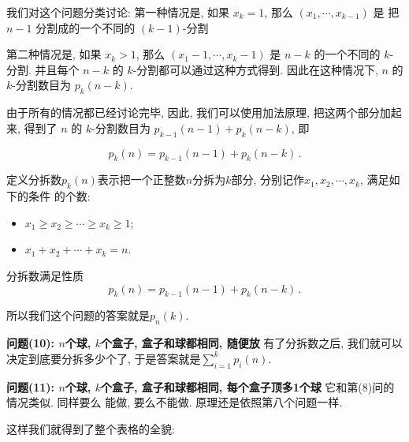 我们对这个问题分类讨论: 第一种情况是, 如果 \(x_k = 1\),
那么 \((x_1,\cdots,x_{k-1})\) 是 把\(n-1\) 分割成的一个不同的 \((k-1)\)-分割

第二种情况是, 如果 \(x_k > 1\), 那么 \((x_1-1,\cdots,x_{k}-1)\) 是 \(n-k\)
的一个不同的 \(k\)-分割. 并且每个 \(n-k\) 的 \(k\)-分割都可以通过这种方式得到.
因此在这种情况下, \(n\) 的 \(k\)-分割数目为 \(p_k(n-k)\).

由于所有的情况都已经讨论完毕, 因此, 我们可以使用加法原理, 把这两个部分加起来, 得到了
\(n\) 的 \(k\)-分割数目为 \(p_{k-1}(n-1) + p_k(n-k)\), 即

\[p_k(n)=p_{k-1}(n-1)+p_k(n-k)\,.\]

\begin{definition}[分拆数]
    定义分拆数$p_k(n)$表示把一个正整数$n$分拆为$k$部分, 分别记作$x_1, x_2, \cdots, x_k$, 满足如下的条件
    的个数:
    \begin{itemize}[noitemsep]
        \item  $x_1\ge x_2\ge\cdots\ge x_k\ge 1$;
        \item $x_1+x_2+\cdots+x_k=n$.
    \end{itemize}
\end{definition}

\begin{theorem}
    分拆数满足性质
    $$p_k(n)=p_{k-1}(n-1)+p_k(n-k)\,.$$
\end{theorem}

所以我们这个问题的答案就是$p_n(k)$.

\textbf{问题(10): $n$个球, $k$个盒子, 盒子和球都相同, 随便放}
有了分拆数之后, 我们就可以决定到底要分拆多少个了,  于是答案就是$\sum_{i=1}^{k}p_i(n)$.

\textbf{问题(11): $n$个球, $k$个盒子, 盒子和球都相同, 每个盒子顶多1个球} 它和第(8)问的情况类似. 同样要么
能做, 要么不能做. 原理还是依照第八个问题一样.

这样我们就得到了整个表格的全貌:

